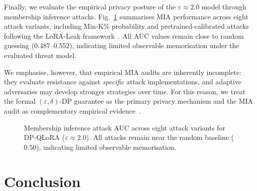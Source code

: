 \documentclass[conference]{IEEEtran}
\begin{document}
Finally, we evaluate the empirical privacy posture of the $\varepsilon \approx 2.0$ model through membership inference attacks. Fig.~\ref{fig:mia} summarises MIA performance across eight attack variants, including Min-K\% probability and pretrained-calibrated attacks following the LoRA-Leak framework~\cite{loraleak}. All AUC values remain close to random guessing ($0.487$--$0.552$), indicating limited observable memorisation under the evaluated threat model.

We emphasise, however, that empirical MIA audits are inherently incomplete: they evaluate resistance against \emph{specific} attack implementations, and adaptive adversaries may develop stronger strategies over time. For this reason, we treat the formal $(\varepsilon, \delta)$-DP guarantee as the primary privacy mechanism and the MIA audit as complementary empirical evidence~\cite{duan2024mia}.

\begin{figure}[!ht]
\centering
{}

\caption{Membership inference attack AUC across eight attack variants for DP-QLoRA ($\varepsilon \approx 2.0$). All attacks remain near the random baseline ($0.50$), indicating limited observable memorisation.}
\label{fig:mia}
\end{figure}

\section{Conclusion}
\label{sec:conclusion}
\end{document}
